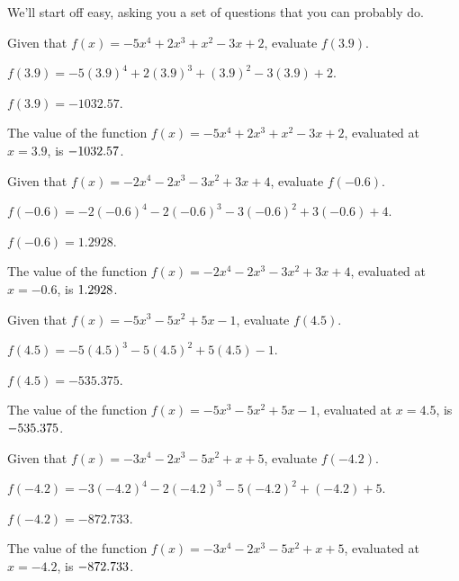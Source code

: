 
We'll start off easy, asking you a set of questions that you can
probably do.


\begin{shuffle}
\begin{exercise}
Given that $f(x)=-5 x^4+2 x^3+x^2-3 x+2$, evaluate $f(3.9)$.
\begin{solution}
\begin{hint}
$f(3.9)=-5 (3.9)^4+2 (3.9)^3+(3.9)^2-3 (3.9)+2$.
\end{hint}
\begin{hint}
$f(3.9)=-1032.57$.
\end{hint}
The value of the function $f(x) = -5 x^4+2 x^3+x^2-3 x+2$, evaluated at $x=3.9$, is ${-1032.57}$.
\end{solution}
\end{exercise}

\begin{exercise}
Given that $f(x)=-2 x^4-2 x^3-3 x^2+3 x+4$, evaluate $f(-0.6)$.
\begin{solution}
\begin{hint}
$f(-0.6)=-2 (-0.6)^4-2 (-0.6)^3-3 (-0.6)^2+3 (-0.6)+4$.
\end{hint}
\begin{hint}
$f(-0.6)=1.2928$.
\end{hint}
The value of the function $f(x) = -2 x^4-2 x^3-3 x^2+3 x+4$, evaluated at $x=-0.6$, is ${1.2928}$.
\end{solution}
\end{exercise}

\begin{exercise}
Given that $f(x)=-5 x^3-5 x^2+5 x-1$, evaluate $f(4.5)$.
\begin{solution}
\begin{hint}
$f(4.5)=-5 (4.5)^3-5 (4.5)^2+5 (4.5)-1$.
\end{hint}
\begin{hint}
$f(4.5)=-535.375$.
\end{hint}
The value of the function $f(x) = -5 x^3-5 x^2+5 x-1$, evaluated at $x=4.5$, is ${-535.375}$.
\end{solution}
\end{exercise}

\begin{exercise}
Given that $f(x)=-3 x^4-2 x^3-5 x^2+x+5$, evaluate $f(-4.2)$.
\begin{solution}
\begin{hint}
$f(-4.2)=-3 (-4.2)^4-2 (-4.2)^3-5 (-4.2)^2+(-4.2)+5$.
\end{hint}
\begin{hint}
$f(-4.2)=-872.733$.
\end{hint}
The value of the function $f(x) = -3 x^4-2 x^3-5 x^2+x+5$, evaluated at $x=-4.2$, is ${-872.733}$.
\end{solution}
\end{exercise}
\end{shuffle}



